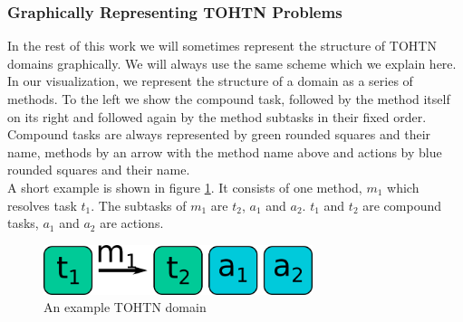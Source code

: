 \subsubsection{Graphically Representing TOHTN Problems}
\label{prelim: graphic tohtn}
In the rest of this work we will sometimes represent the structure of TOHTN domains graphically. We will always use the same scheme which we explain here. In our visualization, we represent the structure of a domain as a series of methods. To the left we show the compound task, followed by the method itself on its right and followed again by the method subtasks in their fixed order. Compound tasks are always represented by green rounded squares and their name, methods by an arrow with the method name above and actions by blue rounded squares and their name.\\
A short example is shown in figure \ref{figure: prelim tohtn example}. It consists of one method, $m_1$ which resolves task $t_1$. The subtasks of $m_1$ are $t_2$, $a_1$ and $a_2$. $t_1$ and $t_2$ are compound tasks, $a_1$ and $a_2$ are actions.
\begin{figure}
	\caption{An example TOHTN domain}
	\label{figure: prelim tohtn example}
	\centering
	\includegraphics[width=0.7\textwidth]{images/final/domain_example}
\end{figure}
